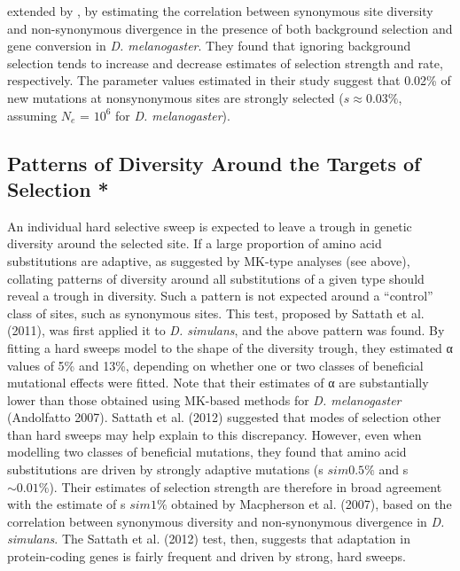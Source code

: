 extended by \cite{RN323}, by estimating the correlation between synonymous site diversity and non-synonymous divergence in the presence of both background selection and gene conversion in \textit{D. melanogaster}. They found that ignoring background selection tends to increase and decrease estimates of selection strength and rate, respectively. The parameter values estimated in their study suggest that 0.02\% of new mutations at nonsynonymous sites are strongly selected ($s \approx 0.03\%$, assuming $N_e$ = $10^6$ for \textit{D. melanogaster}).
 
\subsection[Patterns of Diversity Around the Targets of Selection]{Patterns of Diversity Around the Targets of Selection *}
 
An individual hard selective sweep is expected to leave a trough in genetic diversity around the selected site. If a large proportion of amino acid substitutions are adaptive, as suggested by MK-type analyses (see above), collating patterns of diversity around all substitutions of a given type should reveal a trough in diversity. Such a pattern is not expected around a “control” class of sites, such as synonymous sites. This test, proposed by Sattath et al. (2011), was first applied it to \textit{D. simulans}, and the above pattern was found. By fitting a hard sweeps model to the shape of the diversity trough, they estimated α values of  5\% and 13\%, depending on whether one or two classes of beneficial mutational effects were fitted. Note that their estimates of α are substantially lower than those obtained using MK-based methods for \textit{D. melanogaster} (Andolfatto 2007). Sattath et al. (2012) suggested that modes of selection other than hard sweeps may help explain to this discrepancy. However, even when modelling two classes of beneficial mutations, they found that amino acid substitutions are driven by strongly adaptive mutations (s $sim0.5\%$ and s $\sim0.01\%$). Their estimates of selection strength are therefore in broad agreement with the estimate of s $sim1\%$ obtained by Macpherson et al. (2007), based on the correlation between synonymous diversity and non-synonymous divergence in \textit{D. simulans}. The Sattath et al. (2012) test, then, suggests that adaptation in protein-coding genes is fairly frequent and driven by strong, hard sweeps.
 

